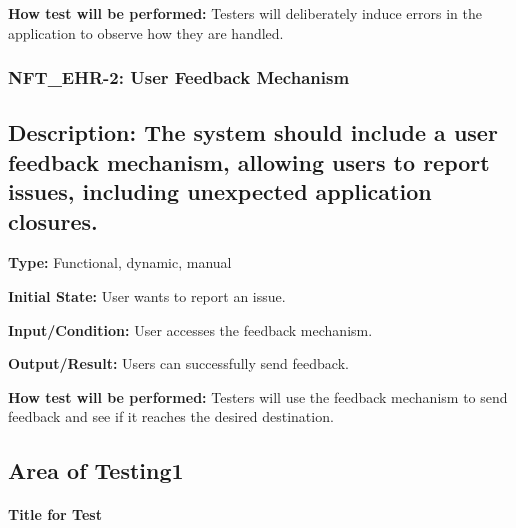\documentclass[12pt, titlepage]{article}
\begin{document}
\textbf{How test will be performed:} Testers will deliberately induce errors in the application to observe how they are handled.

\subsubsection*{\textbf{NFT\_EHR-2: User Feedback Mechanism}}

\subsection{\textbf{Description: }The system should include a user feedback mechanism, allowing users to report issues, including unexpected application closures.}

\textbf{Type: }Functional, dynamic, manual

\textbf{Initial State: }User wants to report an issue.

\textbf{Input/Condition: }User accesses the feedback mechanism.

\textbf{Output/Result:} Users can successfully send feedback.

\textbf{How test will be performed: }Testers will use the feedback mechanism to send feedback and see if it reaches the desired destination. 




\subsection{Area of Testing1}
		
\paragraph{Title for Test}
\end{document}
